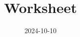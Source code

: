 \documentclass{ctexart}%
\title{Worksheet}%
\date{2024{-}10{-}10}%
\begin{document}
%
\normalsize%
\maketitle%
\end{document}
